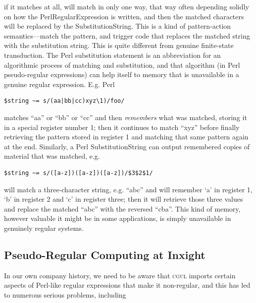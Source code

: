 \documentclass[letterpaper,12pt]{article}
\providecommand{\acro}{}\renewcommand{\acro}{\textsc}
\begin{document}
\noindent
if it matches at all, will match in only
one way, that way often depending solidly on how the PerlRegularExpression is written, and then the matched characters
will be replaced by the SubstitutionString.  This is a kind of pattern-action semantics---match
the pattern, and trigger code that replaces the matched string with the substitution string.
This is quite different from genuine finite-state transduction.
The Perl substitution statement is an abbreviation for an
algorithmic process of matching and substitution, and that algorithm (in Perl pseudo-regular
expressions) can help itself to memory that is unavailable in a genuine regular expression.  E.g. Perl

\begin{Verbatim}[fontsize=\small]
$string ~= s/(aa|bb|cc)xyz\1)/foo/
\end{Verbatim}

\noindent
matches ``aa'' or ``bb'' or ``cc'' and then \emph{remembers} what
was matched, storing it in a special register number 1; then it continues to match ``xyz'' before finally retrieving
the pattern stored in register 1 and matching that same pattern again at the end.  Similarly, a Perl
SubstitutionString can output remembered copies of material that was matched, 
e.g.\@

\begin{Verbatim}[fontsize=\small]
$string ~= s/([a-z])([a-z])([a-z])/$3$2$1/
\end{Verbatim}

\noindent
will match a three-character string, e.g. ``abc'' and will remember `a' in
register 1, `b' in register 2 and `c' in register three; then it will
retrieve those three values and replace the matched ``abc'' with the
reversed ``cba''.  This kind of memory, however valuable it might be in
some applications, is simply unavailable in genuinely regular
systems.

\subsection{Pseudo-Regular Computing at Inxight}

In our own company history, we need to be aware that \acro{cgul} imports certain aspects of Perl-like regular
expressions that make it non-regular, and this has led to numerous serious problems, including
\end{document}
